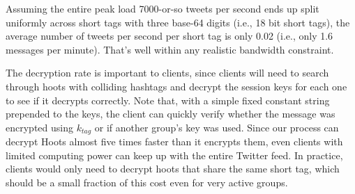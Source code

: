 Assuming the entire peak load 7000-or-so tweets per second ends up
split uniformly across short tags with three base-64 digits (i.e., 18
bit short tags), the average number of tweets per second per short tag
is only 0.02 (i.e., only 1.6 \hoot messages per minute). That's well
within any realistic bandwidth constraint.




The decryption rate is important to clients, since clients will need to
search through hoots with colliding hashtags and decrypt the session
keys for each one to see if it decrypts correctly. Note that, with a
simple fixed constant string prepended to the keys, the client can
quickly verify whether the message was encrypted using $k_{tag}$ or if
another group's key was used. Since our process can decrypt Hoots almost
five times faster than it encrypts them, even clients with limited
computing power can keep up with the entire Twitter feed. In practice,
clients would only need to decrypt hoots that share the same short tag,
which should be a small fraction of this cost even for very active
groups.




\fi
